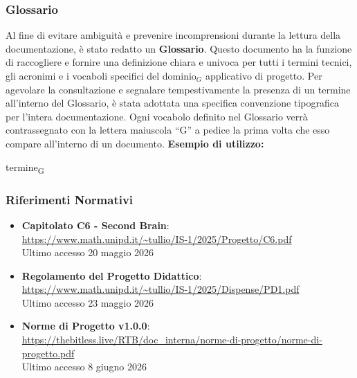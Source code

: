 \documentclass[a4paper, 10pt]{article}
\begin{document}
\subsubsection{Glossario}
Al fine di evitare ambiguità e prevenire incomprensioni durante la lettura della documentazione, è stato redatto un \textbf{Glossario}. Questo documento ha la funzione di raccogliere e fornire una definizione chiara e univoca per tutti i termini tecnici, gli acronimi e i vocaboli specifici del dominio$_G$ applicativo di progetto.
Per agevolare la consultazione e segnalare tempestivamente la presenza di un termine all'interno del Glossario, è stata adottata una specifica convenzione tipografica per l'intera documentazione. 
Ogni vocabolo definito nel Glossario verrà contrassegnato con la lettera maiuscola ``G'' a pedice la prima volta che esso compare all'interno di un documento.
\vspace{0.3cm}
\noindent \textbf{Esempio di utilizzo:} 

termine\textsubscript{G} 

\subsubsection{Riferimenti Normativi}
\begin{itemize}
    \item \textbf{Capitolato C6 - Second Brain}: \\ \url{https://www.math.unipd.it/~tullio/IS-1/2025/Progetto/C6.pdf} \allowbreak \\
    Ultimo accesso 20 maggio 2026
    \item \textbf{Regolamento del Progetto Didattico}: \\ \url{https://www.math.unipd.it/~tullio/IS-1/2025/Dispense/PD1.pdf} \allowbreak \\
    Ultimo accesso 23 maggio 2026
    \item \textbf{Norme di Progetto v1.0.0}: \\ \url{https://thebitless.live/RTB/doc_interna/norme-di-progetto/norme-di-progetto.pdf} \allowbreak \\
    Ultimo accesso 8 giugno 2026
\end{itemize}
\end{document}
